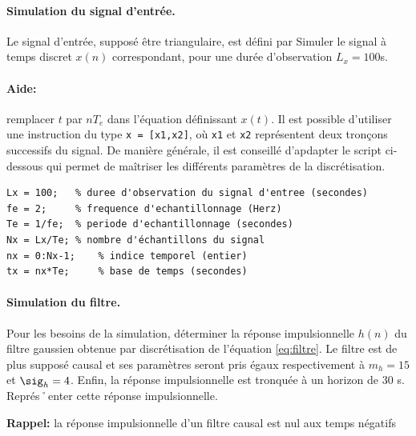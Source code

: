 \paragraph{Simulation du signal d'entrée.} Le signal d'entrée, supposé être triangulaire, est défini par
Simuler le signal à temps discret $x(n)$ correspondant, pour une durée d'observation $L_x = 100$s.

\paragraph{Aide:} remplacer $t$ par $nT_e$ dans l'équation définissant $x(t)$. Il est possible d'utiliser une instruction du type \texttt{x = [x1,x2]}, où \texttt{x1} et \texttt{x2} représentent deux tronçons successifs du signal. De manière générale, il est conseillé d'apdapter le script ci-dessous qui permet de maîtriser les différents paramètres de la discrétisation.

\begin{lstlisting}
Lx = 100;	% duree d'observation du signal d'entree (secondes)
fe = 2;		% frequence d'echantillonnage (Herz)
Te = 1/fe;	% periode d'echantillonnage (secondes)
Nx = Lx/Te;	% nombre d'échantillons du signal
nx = 0:Nx-1;	% indice temporel (entier)
tx = nx*Te;		% base de temps (secondes)
\end{lstlisting}

\paragraph{Simulation du filtre.} Pour les besoins de la simulation, déterminer la réponse impulsionnelle $h(n)$ du filtre gaussien obtenue par discrétisation de l'équation \eqref{eq:filtre}. Le filtre est de plus supposé causal et ses paramètres seront pris égaux respectivement à $m_h = 15$ et $\sig_h = 4$. Enfin, la réponse impulsionnelle est tronquée à un horizon de 30 s. Représ˚enter cette réponse impulsionnelle.

\medbreak

\noindent \textbf{Rappel:} la réponse impulsionnelle d'un filtre causal est nul aux temps négatifs


